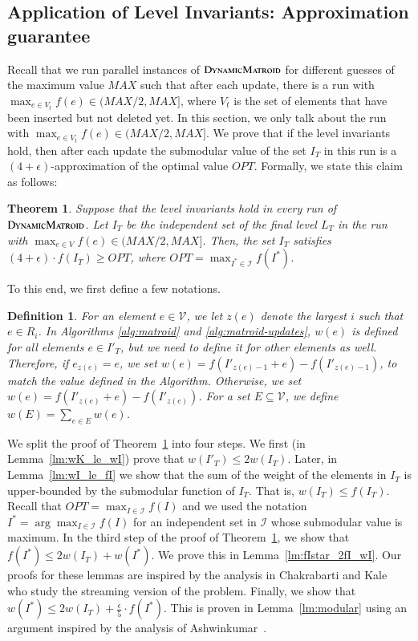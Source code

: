 \documentclass[11pt]{article}
\newtheorem{theorem}{Theorem}
\newtheorem{definition}{Definition}[section]
\newcommand{\dynamicmatroid}{\textsc{DynamicMatroid}}
\newcommand{\ground}{\ensuremath{\mathcal{V}}}
\newcommand{\marginalgain}[2]{f(#2 + #1) - f(#2)}
\begin{document}
\subsection{Application of Level Invariants: Approximation guarantee}
Recall that we run parallel instances of $\dynamicmatroid{}$ for different guesses of the maximum value $MAX$ such that after each update, there is a run with $\max_{e \in V_t} f(e) \in (MAX/2, MAX]$, where $V_t$ is the set of elements that have been inserted but not deleted yet. 
In this section, we only talk about the run with $\max_{e \in V_t} f(e) \in (MAX/2, MAX]$.
We prove that if the level invariants hold, then after each update the submodular value of the set $I_T$ in this run is a $(4+\epsilon)$-approximation 
of the optimal value $OPT$. Formally, we state this claim as follows: 

\begin{theorem}
\label{thm:survivor:gives:approximation}
Suppose that the level invariants hold in every run of $\dynamicmatroid{}$. 
Let $I_T$ be the independent set of the final level $L_T$ in the run with $\max_{e \in V} f(e) \in (MAX/2, MAX]$. 
Then, the set $I_T$ satisfies $(4 + \epsilon) \cdot f(I_T) \ge  OPT$, 
where $OPT = \max_{I^* \in \mathcal{I}} f(I^*)$.
\end{theorem}

To this end, we first define a few notations.
\begin{definition}
    For an element $e \in \ground$, we let $z(e)$ denote the largest $i$ such that $e \in R_i$.
    In Algorithms \ref{alg:matroid} and \ref{alg:matroid-updates}, $w(e)$ is defined for all elements $e\in I'_T$, but we need to define it for other elements as well. Therefore, if $e_{z(e)} = e$, we set $w(e)  = \marginalgain{e}{I'_{z(e) - 1}}$, to match the value defined in the Algorithm. Otherwise, we set $w(e) = \marginalgain{e}{I'_{z(e)}}$.
    For a set $E \subseteq \ground$, we define $w(E)=\sum_{e\in E} w(e)$.
\end{definition}

We split the proof of Theorem~\ref{thm:survivor:gives:approximation} into four steps.
We first (in Lemma~\ref{lm:wK_le_wI}) prove that $w(I'_T) \le 2w(I_T)$. 
Later, in Lemma~\ref{lm:wI_le_fI}  we show that the sum of the weight of the elements in $I_T$ 
is upper-bounded by the submodular function of $I_T$.  That is, $w(I_T) \le f(I_T)$. 
Recall that $OPT = \max_{I \in \mathcal{I}} f(I)$ and we used the notation 
$I^* = \arg\max_{I \in \mathcal{I}} f(I) $ 
for an independent set in $\mathcal{I}$ whose submodular value is maximum. 
In the third step of the proof of Theorem~\ref{thm:survivor:gives:approximation}, 
we show that $f(I^*) \le 2w(I_T) + w(I^*)$. We prove this in Lemma~\ref{lm:fIstar_2fI_wI}.
Our proofs for these lemmas are inspired by the analysis
in Chakrabarti and Kale~\cite{chakrabarti2015submodular} who study
the streaming version of the problem.
Finally, we show that $w(I^*) \le  2w(I_T) + \frac{\epsilon}{5} \cdot f(I^*)$.
This is proven in Lemma~\ref{lm:modular} using an argument
inspired by the analysis of Ashwinkumar~\cite{badanidiyuru2011buyback}.
\end{document}
